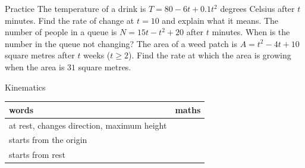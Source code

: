 \documentclass[aspectratio=169,11pt,t,xcolor=table]{beamer}
\newlength\figunit
\begin{document}
\begin{frame}{Practice}\relax
{} The temperature of a drink is $T=80-6t+0.1t^{2}$ degrees Celsius after $t$ minutes. Find the rate of change at $t=10$ and explain what it means.
\vskip4mm
 The number of people in a queue is $N=15t-t^{2}+20$ after $t$ minutes. When is the number in the queue not changing?
\vskip4mm
 The area of a weed patch is $A=t^{2}-4t+10$ square metres after $t$ weeks ($t\ge2$). Find the rate at which the area is growing when the area is $31$ square metres.
\end{frame}

\begin{frame}{Kinematics}\relax
\centering
\setlength\figunit{10mm}

\vskip3mm
\raggedright
\renewcommand{\arraystretch}{1.25}
\begin{tabular}{@{}p{105mm}p{45mm}@{}}
\toprule
words & maths\\
\midrule
at rest, changes direction, maximum height & \\
starts from the origin & \\
starts from rest & \\
\bottomrule
\end{tabular}
\end{frame}
\end{document}

